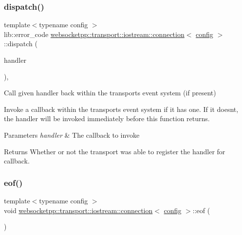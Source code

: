 \subsubsection{\texorpdfstring{dispatch()}{dispatch()}}
{\footnotesize\ttfamily template$<$typename config $>$ \\
lib\+::error\+\_\+code \mbox{\hyperlink{classwebsocketpp_1_1transport_1_1iostream_1_1connection}{websocketpp\+::transport\+::iostream\+::connection}}$<$ \mbox{\hyperlink{classconfig}{config}} $>$\+::dispatch (\begin{DoxyParamCaption}\item[{\mbox{\hyperlink{namespacewebsocketpp_1_1transport_a6658447b2e10f4c712dd792aad0e0c78}{dispatch\+\_\+handler}}}]{handler }\end{DoxyParamCaption})\hspace{0.3cm}{\ttfamily [inline]}, {\ttfamily [protected]}}



Call given handler back within the transport\textquotesingle{}s event system (if present) 

Invoke a callback within the transport\textquotesingle{}s event system if it has one. If it doesn\textquotesingle{}t, the handler will be invoked immediately before this function returns.


\begin{DoxyParams}{Parameters}
{\em handler} & The callback to invoke\\
\hline
\end{DoxyParams}
\begin{DoxyReturn}{Returns}
Whether or not the transport was able to register the handler for callback. 
\end{DoxyReturn}
\mbox{\label{classwebsocketpp_1_1transport_1_1iostream_1_1connection_a88529f4130f75beed493c84c861e66cf}} 
\subsubsection{\texorpdfstring{eof()}{eof()}}
{\footnotesize\ttfamily template$<$typename config $>$ \\
void \mbox{\hyperlink{classwebsocketpp_1_1transport_1_1iostream_1_1connection}{websocketpp\+::transport\+::iostream\+::connection}}$<$ \mbox{\hyperlink{classconfig}{config}} $>$\+::eof (\begin{DoxyParamCaption}{ }\end{DoxyParamCaption})\hspace{0.3cm}{\ttfamily [inline]}}



